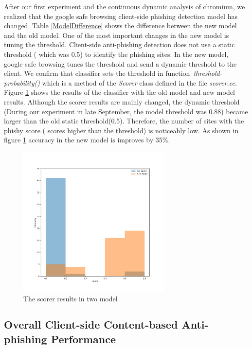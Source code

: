 \documentclass[letterpaper,twocolumn,10pt]{article}
\begin{document}
After our first experiment and the continuous dynamic analysis of chromium, we realized that the google safe browsing client-side phishing detection model has changed. 
Table \ref{ModelDifference} shows the difference between the new model and the old model. One of the most important changes in the new model is tuning the threshold.
Client-side anti-phishing detection does not use a static threshold ( which was 0.5) to identify the phishing sites. In the new model, google safe browsing tunes the threshold and send a dynamic threshold to the client. 
We confirm that classifier sets the threshold in function~\textit{threshold-probability()} which is a method of the \textit{Scorer} class defined in the file \textit{scorer.cc}. 
Figure \ref{fig:two model} shows the results of the classifier with the old model and new model results. Although the scorer results are mainly changed, the dynamic threshold (During our experiment in late September, the model threshold was 0.88) became larger than the old static threshold(0.5). Therefore, the number of sites with the phishy score ( scores higher than the threshold) is noticeably low.
As shown in figure \ref{fig:two model} accuracy in the new model is improves by 35\%. 

 \begin{figure}
\centering
\includegraphics[height=3in, width=3in]{image (1).png}
\caption{The scorer results in two model }
\label{fig:two model}
\end{figure} 

\subsection{Overall Client-side Content-based Anti-phishing Performance}
\end{document}

